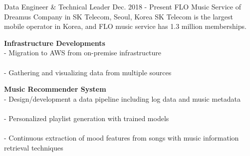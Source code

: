 

\begin{cventries}
    \cventry
        {Data Engineer \& Technical Leader} %
        {Dec. 2018 - Present} %
        {FLO Music Service of Dreamus Company in SK Telecom, } %
        {Seoul, Korea}%
        { %
            SK Telecom is the largest mobile operator in Korea, and FLO music service has 1.3 million memberships.
        }
        { %
            \begin{cvitems}
                \item {
                    {\bf Infrastructure Developments} \\
                    - Migration to AWS from on-premise infrastructure \\
                         \\
                    - Gathering and visualizing data from multiple sources \\
                         \nn
                }
                \item {
                    {\bf Music Recommender System} \\
                    - Design/development a data pipeline including log data and music metadata \\
                         \\
                    - Personalized playlist generation with trained models \\
                         \\
                    - Continuous extraction of mood features from songs with music information retrieval techniques \\
                         \nn
                }
            \end{cvitems}
        }


\end{cventries}
